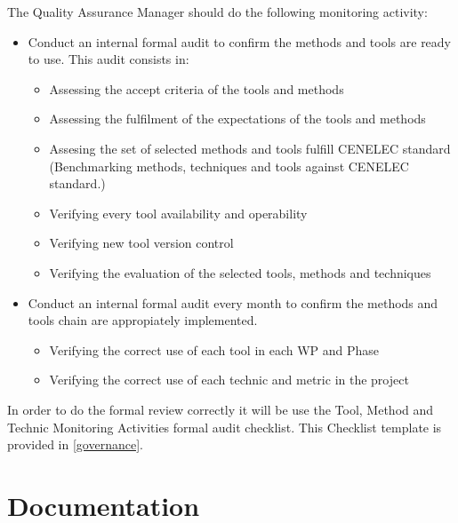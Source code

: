 \documentclass{template/openetcs_article}
\begin{document}
The Quality Assurance Manager should do the following monitoring activity:
\begin{itemize}
\item Conduct an internal formal audit to confirm the methods and tools are ready to use. This audit consists in:
\begin{itemize}
\item Assessing the accept criteria of the tools and methods
\item Assessing the fulfilment of the expectations of the tools and methods
\item Assesing the set of selected methods and tools fulfill CENELEC standard (Benchmarking methods, techniques and tools against CENELEC standard.)
\item Verifying every tool availability and operability
\item Verifying new tool version control
\item Verifying the evaluation of the selected tools, methods and techniques
\end{itemize}
\item Conduct an internal formal audit every month to confirm the methods and tools chain are appropiately implemented. 
\begin{itemize}
\item Verifying the correct use of each tool in each WP and Phase
\item Verifying the correct use of each technic and metric in the project
\end{itemize}
\end{itemize}

In order to do the formal review correctly it will be use the Tool, Method and Technic Monitoring Activities formal audit checklist. This Checklist template is provided in \href{https://github.com/openETCS/governance/tree/master/Templates}{[governance]}.

\section{Documentation}
\end{document}
